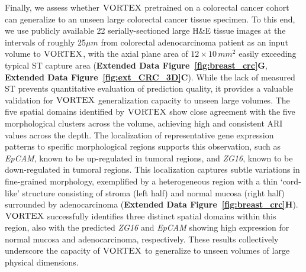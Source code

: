 Finally, we assess whether $\textsc{VORTEX}$ pretrained on a colorectal cancer cohort can generalize to an unseen large colorectal cancer tissue specimen. To this end, we use publicly available 22 serially-sectioned large H\&E tissue images at the intervals of roughly 25$\mu m$ from colorectal adenocarcinoma patient\cite{lin2023multiplexed} as an input volume to $\textsc{VORTEX}$, with the axial plane area of $12 \times 10\, mm^2$ easily exceeding typical ST capture area (\textbf{Extended Data Figure~\ref{fig:breast_crc}G}, \textbf{Extended Data Figure~\ref{fig:ext_CRC_3D}C}). While the lack of measured ST prevents quantitative evaluation of prediction quality, it provides a valuable validation for $\textsc{VORTEX}$ generalization capacity to unseen large volumes.
The five spatial domains identified by $\textsc{VORTEX}$ show close agreement with the five morphological clusters across the volume, achieving high and consistent ARI values across the depth. The localization of representative gene expression patterns to specific morphological regions supports this observation, such as \textit{EpCAM}, known to be up-regulated in tumoral regions\cite{spizzo2011epcam}, and \textit{ZG16}, known to be down-regulated in tumoral regions\cite{xu2020identification}. This localization captures subtle variations in fine-grained morphology, exemplified by a heterogeneous region with a thin `cord-like' structure consisting of stroma (left half) and normal mucosa (right half) surrounded by adenocarcinoma (\textbf{Extended Data Figure~\ref{fig:breast_crc}H}). $\textsc{VORTEX}$ successfully identifies three distinct spatial domains within this region, also with the predicted \textit{ZG16} and \textit{EpCAM} showing high expression for normal mucosa and adenocarcinoma, respectively. These results collectively underscore the capacity of $\textsc{VORTEX}$ to generalize to unseen volumes of large physical dimensions.


